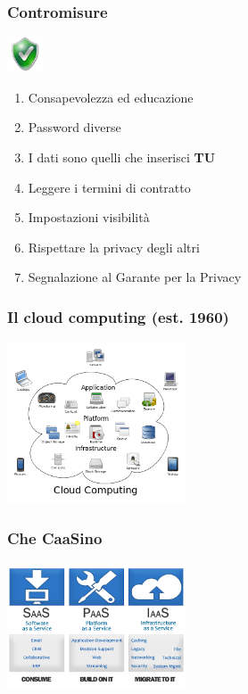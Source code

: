 \documentclass[xcolor=svgnames]{beamer}
\begin{document}
\begin{frame}
		\frametitle{Contromisure}

	\begin{block}{\includegraphics[width=40px]{img/shield.png}}
			\begin{enumerate}
					\item Consapevolezza ed educazione
						\pause
					\item Password diverse
						\pause
					\item I dati sono quelli che inserisci {\bf TU}
						\pause
					\item Leggere i termini di contratto
						\pause
					\item Impostazioni visibilità
						\pause
					\item Rispettare la privacy degli altri
						\pause
					\item Segnalazione al Garante per la Privacy
			\end{enumerate}
	\end{block}
\end{frame}

\begin{frame}
	\frametitle{Il cloud computing (est. 1960)}

	\begin{center}
		\includegraphics[width=200px]{img/cloud1.png}
	\end{center}
\end{frame}

\begin{frame}
	\frametitle{Che CaaSino}

	\begin{center}
		\includegraphics[width=200px]{img/service.png}
	\end{center}
\end{frame}
\end{document}

